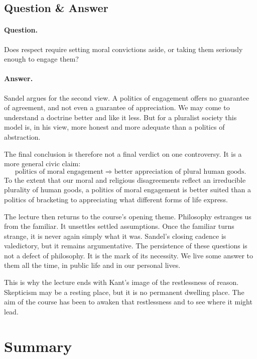 \subsection{Question \& Answer}

\paragraph{Question.} Does respect require setting moral convictions aside, or taking them seriously enough to engage them?

\paragraph{Answer.} Sandel argues for the second view. A politics of engagement offers no guarantee of agreement, and not even a guarantee of appreciation. We may come to understand a doctrine better and like it less. But for a pluralist society this model is, in his view, more honest and more adequate than a politics of abstraction.

The final conclusion is therefore not a final verdict on one controversy. It is a more general civic claim:
\begin{equation}
\text{politics of moral engagement}
\Longrightarrow
\text{better appreciation of plural human goods}.
\end{equation}
To the extent that our moral and religious disagreements reflect an irreducible plurality of human goods, a politics of moral engagement is better suited than a politics of bracketing to appreciating what different forms of life express.

The lecture then returns to the course's opening theme. Philosophy estranges us from the familiar. It unsettles settled assumptions. Once the familiar turns strange, it is never again simply what it was. Sandel's closing cadence is valedictory, but it remains argumentative. The persistence of these questions is not a defect of philosophy. It is the mark of its necessity. We live some answer to them all the time, in public life and in our personal lives.

This is why the lecture ends with Kant's image of the restlessness of reason. Skepticism may be a resting place, but it is no permanent dwelling place. The aim of the course has been to awaken that restlessness and to see where it might lead.

\section{Summary}

